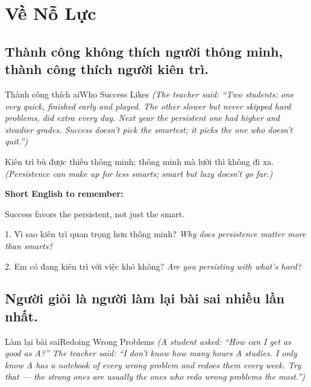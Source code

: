 \chapter{Về Nỗ Lực}

\section{Thành công không thích người thông minh, thành công thích người kiên trì.}
\begin{truyen}{Thành công thích ai}{Who Success Likes}
\textit{(The teacher said: ``Two students: one very quick, finished early and played. The other slower but never skipped hard problems, did extra every day. Next year the persistent one had higher and steadier grades. Success doesn't pick the smartest; it picks the one who doesn't quit.'')}
\end{truyen}

\begin{baihoc}
Kiên trì bù được thiếu thông minh; thông minh mà lười thì không đi xa.
\textit{(Persistence can make up for less smarts; smart but lazy doesn't go far.)}
\end{baihoc}

\begin{ghinhoanh}
\textbf{Short English to remember:}

Success favors the persistent, not just the smart.

\end{ghinhoanh}

\begin{tuhocnhanh}
1. Vì sao kiên trì quan trọng hơn thông minh? \textit{Why does persistence matter more than smarts?}

2. Em có đang kiên trì với việc khó không? \textit{Are you persisting with what's hard?}
\end{tuhocnhanh}
\ngancach

\section{Người giỏi là người làm lại bài sai nhiều lần nhất.}
\begin{truyen}{Làm lại bài sai}{Redoing Wrong Problems}
\textit{(A student asked: ``How can I get as good as A?'' The teacher said: ``I don't know how many hours A studies. I only know A has a notebook of every wrong problem and redoes them every week. Try that — the strong ones are usually the ones who redo wrong problems the most.'')}
\end{truyen}

